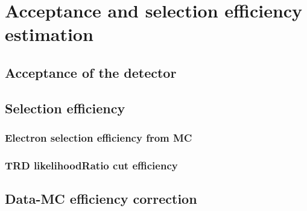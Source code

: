 \section{Acceptance and selection efficiency estimation}

\subsection{Acceptance of the detector}

\subsection{Selection efficiency}
\subsubsection{Electron selection efficiency from MC}
\subsubsection{TRD likelihoodRatio cut efficiency}\label{sec:EffTRD}

\subsection{Data-MC efficiency correction}\label{sec:EpsiCorr}